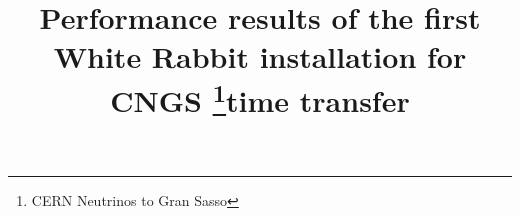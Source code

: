\documentclass[conference]{IEEEtran}
\begin{document}
\title{Performance results of the first White Rabbit installation for CNGS 
        \footnote{CERN Neutrinos to Gran Sasso}time transfer  }



\maketitle













\end{document}
